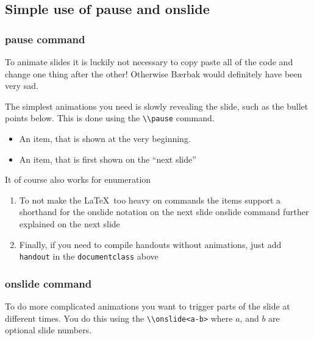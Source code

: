\documentclass[english, aspectratio=169]{beamer}
\begin{document}
\subsection{Simple use of pause and onslide}
\begin{frame}
  \frametitle{pause command}
  To animate slides it is luckily not necessary to copy paste all of the code
  and change one thing after the other! Otherwise Bærbak would definitely have
  been very sad.

  The simplest animations you need is slowly revealing the slide, such as the
  bullet points below. This is done using the \lstinline{\\pause}
  command.

  \begin{itemize}
  \item An item, that is shown at the very beginning.

    \pause

  \item An item, that is first shown on the ``next slide''
  \end{itemize}

  \pause

  It of course also works for enumeration
  \begin{enumerate}
  \item<+-> To not make the \LaTeX\ too heavy on commands the items support a
    shorthand for the onslide notation on the next slide
    onslide command further explained on the next slide
  \item<+-> Finally, if you need to compile handouts without animations, just add
    \lstinline{handout} in the \lstinline{documentclass} above
  \end{enumerate}
\end{frame}

\begin{frame}
  \frametitle{onslide command}

  To do more complicated animations you want to trigger parts of the slide at
  different times. You do this using the \lstinline{\\onslide<a-b>} where $a$,
  and $b$ are optional slide numbers.




\end{frame}
\end{document}
